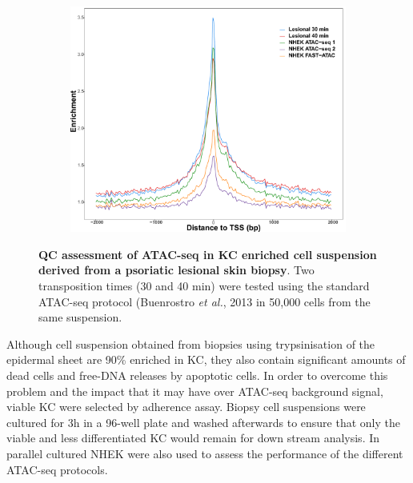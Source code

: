 \begin{figure}[htbp]
\begin{subfigure}{0.45\textwidth}
\caption{\textbf{}}
\end{subfigure}%
\begin{subfigure}{0.45\textwidth}
\centering
\includegraphics[width=\textwidth]{./Results1/pdfs/ATAC_skin_TSS_enrichment_PS02_30_40min_NHEK_ATAC1_ATAC_2_FAST_ATAC}
\caption{\textbf{}} %
\end{subfigure}
\caption[QC assessment of ATAC-seq in KC enriched cell suspension derived from a psoriatic lesional skin biopsy]{\textbf{QC assessment of ATAC-seq in KC enriched cell suspension derived from a psoriatic lesional skin biopsy}. Two transposition times (30 and 40 min) were tested using the standard ATAC-seq protocol (Buenrostro \textit{et al.}, 2013 in 50,000 cells from the same suspension.}
\label{fig:PS02_skin_ATAC_QC_assessment}
\end{figure} 




Although cell suspension obtained from biopsies using trypsinisation of the epidermal sheet are 90\% enriched in KC, they also contain significant amounts of dead cells and free-DNA releases by apoptotic cells. In order to overcome this problem and the impact that it may have over ATAC-seq background signal, viable KC were selected by adherence assay. Biopsy cell suspensions were cultured for 3h in a 96-well plate and washed afterwards to ensure that only the viable and less differentiated KC would remain for down stream analysis. In parallel cultured NHEK were also used to assess the performance of the different ATAC-seq protocols.


